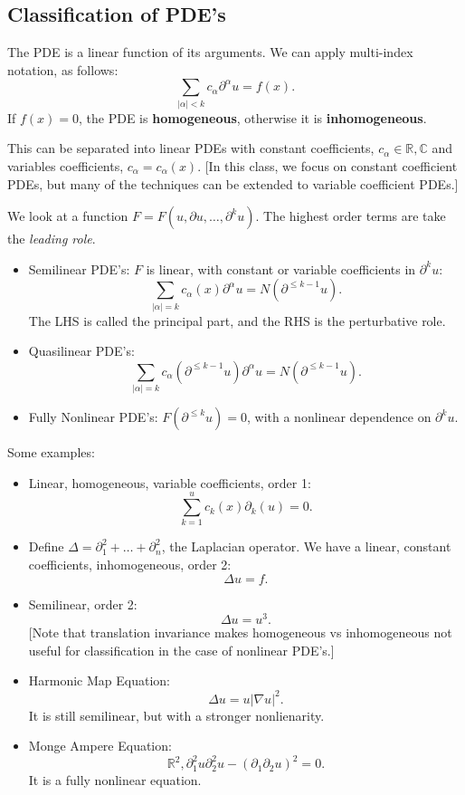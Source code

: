 \documentclass[11pt]{scrartcl}
\newcommand{\R}{\mathbb{R}}
\newcommand{\C}{\mathbb C}
\begin{document}
\subsection{Classification of PDE's}
\begin{definition} The PDE is a linear function of its arguments.  We can apply multi-index notation, as follows:
$$\sum_{|\alpha| < k} c_\alpha \partial^{\alpha}u = f(x).$$
If $f(x) = 0$, the PDE is \textbf{homogeneous}, otherwise it is \textbf{inhomogeneous}.
\end{definition}
This can be separated into linear PDEs with constant coefficients, $c_{\alpha } \in \R, \C$ and variables coefficients, $c_{\alpha} = c_{\alpha}(x)$.  [In this class, we focus on constant coefficient PDEs, but many of the techniques can be extended to variable coefficient PDEs.]
\begin{definition}We look at a function $F = F(u, \partial u, \dots, \partial^k u)$.  The highest order terms are take the \textit{leading role}. 
\begin{itemize}
\item Semilinear PDE's: $F$ is linear, with constant or variable coefficients in $\partial^k u$: $$\sum_{|\alpha| = k} c_{\alpha}(x)\partial^\alpha u = N(\partial^{\le k-1}u).$$
The LHS is called the principal part, and the RHS is the perturbative role.
\item Quasilinear PDE's: 
$$\sum_{|\alpha|=k} c_{\alpha}(\partial^{\le k-1} u) \partial^{\alpha}u = N(\partial^{\le k-1}u).$$
\item Fully Nonlinear PDE's: $F(\partial^{\le k} u) = 0$, with a nonlinear dependence on $\partial^k u$.  
\end{itemize}
\end{definition}
Some examples:
\begin{itemize}
\item Linear, homogeneous, variable coefficients, order 1:$$\sum_{k=1}^u c_k(x)\partial_k(u) = 0.$$
\item Define $\Delta = \partial_1^2 + \dots + \partial_n^2$, the Laplacian operator.  We have a linear, constant coefficients, inhomogeneous, order 2:$$\Delta u = f.$$
\item Semilinear, order 2: $$\Delta u = u^3.$$ [Note that translation invariance makes homogeneous vs inhomogeneous not useful for classification in the case of nonlinear PDE's.]
\item Harmonic Map Equation:
$$\Delta u = u |\nabla u|^2.$$
It is still semilinear, but with a stronger nonlienarity.
\item Monge Ampere Equation:
$$\R^2, \partial_1^2 u \partial_2^2 u - (\partial_1 \partial_2 u)^2 = 0.$$
It is a fully nonlinear equation.
\end{itemize}
\end{document}
